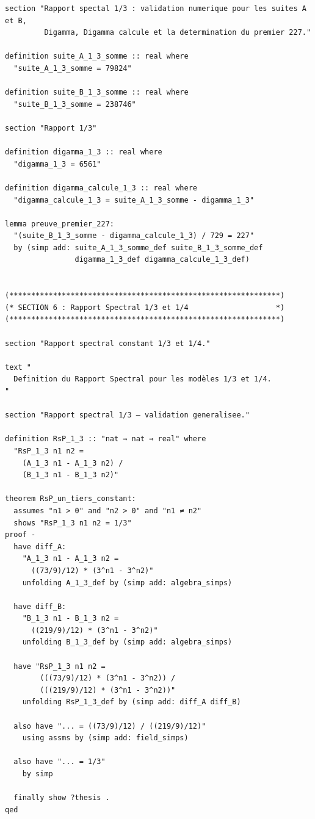 \documentclass[a4paper,11pt]{article}
\begin{document}
\begin{holcode}[title={\textcolor{white}{Fichier : methode\_spectral.thy -- Partie 3/4}}]
\begin{lstlisting}
section "Rapport spectal 1/3 : validation numerique pour les suites A et B, 
         Digamma, Digamma calcule et la determination du premier 227."

definition suite_A_1_3_somme :: real where
  "suite_A_1_3_somme = 79824"

definition suite_B_1_3_somme :: real where
  "suite_B_1_3_somme = 238746"

section "Rapport 1/3"

definition digamma_1_3 :: real where
  "digamma_1_3 = 6561"

definition digamma_calcule_1_3 :: real where
  "digamma_calcule_1_3 = suite_A_1_3_somme - digamma_1_3"

lemma preuve_premier_227:
  "(suite_B_1_3_somme - digamma_calcule_1_3) / 729 = 227"
  by (simp add: suite_A_1_3_somme_def suite_B_1_3_somme_def
                digamma_1_3_def digamma_calcule_1_3_def)


(**************************************************************)
(* SECTION 6 : Rapport Spectral 1/3 et 1/4                    *)
(**************************************************************)

section "Rapport spectral constant 1/3 et 1/4."

text "
  Definition du Rapport Spectral pour les modèles 1/3 et 1/4.
"

section "Rapport spectral 1/3 – validation generalisee."

definition RsP_1_3 :: "nat ⇒ nat ⇒ real" where
  "RsP_1_3 n1 n2 =
    (A_1_3 n1 - A_1_3 n2) /
    (B_1_3 n1 - B_1_3 n2)"

theorem RsP_un_tiers_constant:
  assumes "n1 > 0" and "n2 > 0" and "n1 ≠ n2"
  shows "RsP_1_3 n1 n2 = 1/3"
proof -
  have diff_A:
    "A_1_3 n1 - A_1_3 n2 =
      ((73/9)/12) * (3^n1 - 3^n2)"
    unfolding A_1_3_def by (simp add: algebra_simps)

  have diff_B:
    "B_1_3 n1 - B_1_3 n2 =
      ((219/9)/12) * (3^n1 - 3^n2)"
    unfolding B_1_3_def by (simp add: algebra_simps)

  have "RsP_1_3 n1 n2 =
        (((73/9)/12) * (3^n1 - 3^n2)) /
        (((219/9)/12) * (3^n1 - 3^n2))"
    unfolding RsP_1_3_def by (simp add: diff_A diff_B)

  also have "... = ((73/9)/12) / ((219/9)/12)"
    using assms by (simp add: field_simps)

  also have "... = 1/3"
    by simp

  finally show ?thesis .
qed



\end{lstlisting}
\end{holcode}
\end{document}
